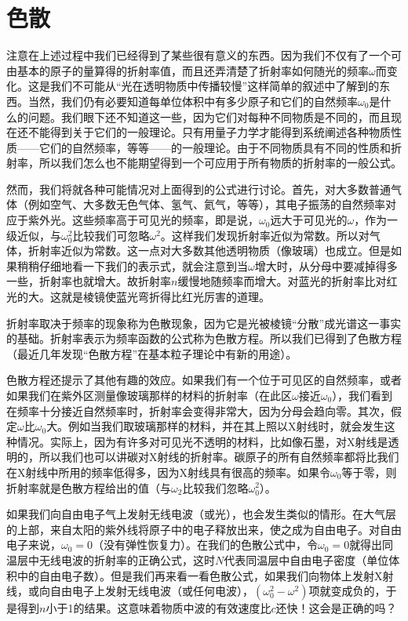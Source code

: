 \section{色散}

注意在上述过程中我们已经得到了某些很有意义的东西。因为我们不仅有了一个可由基本的原子的量算得的折射率值，而且还弄清楚了折射率如何随光的频率$\omega$而变化。这是我们不可能从“光在透明物质中传播较慢”这样简单的叙述中了解到的东西。当然，我们仍有必要知道每单位体积中有多少原子和它们的自然频率$\omega_0$是什么的问题。我们眼下还不知道这一些，因为它们对每种不同物质是不同的，而且现在还不能得到关于它们的一般理论。只有用量子力学才能得到系统阐述各种物质性质——它们的自然频率，等等——的一般理论。由于不同物质具有不同的性质和折射率，所以我们怎么也不能期望得到一个可应用于所有物质的折射率的一般公式。

然而，我们将就各种可能情况对上面得到的公式进行讨论。首先，对大多数普通气体（例如空气、大多数无色气体、氢气、氦气，等等），其电子振荡的自然频率对应于紫外光。这些频率高于可见光的频率，即是说，$\omega_0$远大于可见光的$\omega$，作为一级近似，与$\omega_0^2$比较我们可忽略$\omega^2$。这样我们发现折射率近似为常数。所以对气体，折射率近似为常数。这一点对大多数其他透明物质（像玻璃）也成立。但是如果稍稍仔细地看一下我们的表示式，就会注意到当$\omega$增大时，从分母中要减掉得多一些，折射率也就增大。故折射率$n$缓慢地随频率而增大。对蓝光的折射率比对红光的大。这就是棱镜使蓝光弯折得比红光厉害的道理。

折射率取决于频率的现象称为色散现象，因为它是光被棱镜“分散”成光谱这一事实的基础。折射率表示为频率函数的公式称为色散方程。所以我们已得到了色散方程（最近几年发现“色散方程”在基本粒子理论中有新的用途）。

色散方程还提示了其他有趣的效应。如果我们有一个位于可见区的自然频率，或者如果我们在紫外区测量像玻璃那样的材料的折射率（在此区$\omega$接近$\omega_0$），我们看到在频率十分接近自然频率时，折射率会变得非常大，因为分母会趋向零。其次，假定$\omega$比$\omega_0$大。例如当我们取玻璃那样的材料，并在其上照以X射线时，就会发生这种情况。实际上，因为有许多对可见光不透明的材料，比如像石墨，对X射线是透明的，所以我们也可以讲碳对X射线的折射率。碳原子的所有自然频率都将比我们在X射线中所用的频率低得多，因为X射线具有很高的频率。如果令$\omega_0$等于零，则折射率就是色散方程给出的值（与$\omega_2$比较我们忽略$\omega_0^2$）。

如果我们向自由电子气上发射无线电波（或光），也会发生类似的情形。在大气层的上部，来自太阳的紫外线将原子中的电子释放出来，使之成为自由电子。对自由电子来说，$\omega_0=0$（没有弹性恢复力）。在我们的色散公式中，令$\omega_0=0$就得出同温层中无线电波的折射率的正确公式，这时$N$代表同温层中自由电子密度（单位体积中的自由电子数）。但是我们再来看一看色散公式，如果我们向物体上发射X射线，或向自由电子上发射无线电波（或任何电波），$(\omega_0^2 - \omega^2)$项就变成负的，于是得到$n$小于1的结果。这意味着物质中波的有效速度比$c$还快！这会是正确的吗？

